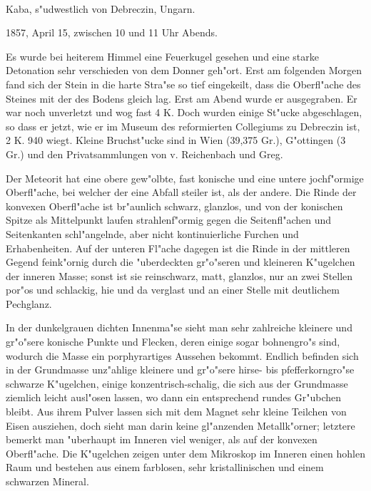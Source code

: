 \documentclass[a4paper, 11pt, oneside]{article}
\begin{document}
\paragraph{}
Kaba, s"udwestlich von Debreczin, Ungarn.

1857, April 15, zwischen 10 und 11 Uhr Abends.

Es wurde bei heiterem Himmel eine Feuerkugel gesehen und eine starke Detonation sehr verschieden von dem Donner geh"ort. Erst am folgenden Morgen fand sich der Stein in die harte Stra"se so tief eingekeilt, dass die Oberfl"ache des Steines mit der des Bodens gleich lag. Erst am Abend wurde er ausgegraben. Er war noch unverletzt und wog fast 4 K. Doch wurden einige St"ucke abgeschlagen, so dass er jetzt, wie er im Museum des reformierten Collegiums zu Debreczin ist, 2 K. 940 wiegt. Kleine Bruchst"ucke sind in Wien (39,375 Gr.), G"ottingen (3 Gr.) und den Privatsammlungen von v. Reichenbach und Greg.

Der Meteorit hat eine obere gew"olbte, fast konische und eine untere jochf"ormige Oberfl"ache, bei welcher der eine Abfall steiler ist, als der andere. Die Rinde der konvexen Oberfl"ache ist br"aunlich schwarz, glanzlos, und von der konischen Spitze als Mittelpunkt laufen strahlenf"ormig gegen die Seitenfl"achen und Seitenkanten schl"angelnde, aber nicht kontinuierliche Furchen und Erhabenheiten. Auf der unteren Fl"ache dagegen ist die Rinde in der mittleren Gegend feink"ornig durch die "uberdeckten gr"o"seren und kleineren K"ugelchen der inneren Masse; sonst ist sie reinschwarz, matt, glanzlos, nur an zwei Stellen por"os und schlackig, hie und da verglast und an einer Stelle mit deutlichem Pechglanz.

In der dunkelgrauen dichten Innenma"se sieht man sehr zahlreiche kleinere und gr"o"sere konische Punkte und Flecken, deren einige sogar bohnengro"s sind, wodurch die Masse ein porphyrartiges Aussehen bekommt. Endlich befinden sich in der Grundmasse unz"ahlige kleinere und gr"o"sere hirse- bis pfefferkorngro"se schwarze K"ugelchen, einige konzentrisch-schalig, die sich aus der Grundmasse ziemlich leicht ausl"osen lassen, wo dann ein entsprechend rundes Gr"ubchen bleibt. Aus ihrem Pulver lassen sich mit dem Magnet sehr kleine Teilchen von Eisen ausziehen, doch sieht man darin keine gl"anzenden Metallk"orner; letztere bemerkt man "uberhaupt im Inneren viel weniger, als auf der konvexen Oberfl"ache. Die K"ugelchen zeigen unter dem Mikroskop im Inneren einen hohlen Raum und bestehen aus einem farblosen, sehr kristallinischen und einem schwarzen Mineral.
\end{document}
